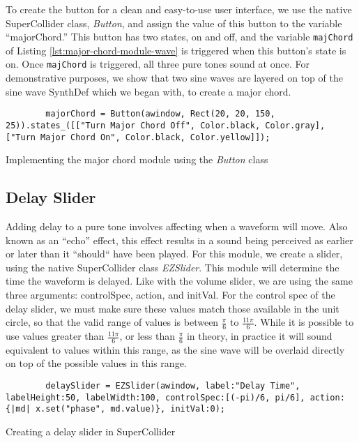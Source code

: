 To create the button for a clean and easy-to-use user interface, we use the native SuperCollider class, \textit{Button}, and assign the value of this button to the variable ``majorChord.'' This button has two states, on and off, and the variable \texttt{majChord} of Listing \ref{lst:major-chord-module-wave} is triggered when this button's state is on. Once \texttt{majChord} is triggered, all three pure tones sound at once. For demonstrative purposes, we show that two sine waves are layered on top of the sine wave SynthDef which we began with, to create a major chord.

\begin{listing}
	\begin{lstlisting}
		majorChord = Button(awindow, Rect(20, 20, 150, 25)).states_([["Turn Major Chord Off", Color.black, Color.gray], ["Turn Major Chord On", Color.black, Color.yellow]]);	
	\end{lstlisting}
	\label{lst:major-chord-button-wave}
	\caption{Implementing the major chord module using the \textit{Button} class}
\end{listing}

\subsection{Delay Slider}

Adding delay to a pure tone involves affecting when a waveform will move. Also known as an ``echo'' effect, this effect results in a sound being perceived as earlier or later than it ``should`` have been played. For this module, we create a slider, using the native SuperCollider class \textit{EZSlider}. This module will determine the time the waveform is delayed. Like with the volume slider, we are using the same three arguments: controlSpec, action, and initVal. For the control spec of the delay slider, we must make sure these values match those available in the unit circle, so that the valid range of values is between $\frac{\pi}{6}$ to $\frac{11\pi}{6}$. While it is possible to use values greater than $\frac{11\pi}{6}$, or less than $\frac{\pi}{6}$ in theory, in practice it will sound equivalent to values within this range, as the sine wave will be overlaid directly on top of the possible values in this range. 

\begin{listing}
	\begin{lstlisting}
		delaySlider = EZSlider(awindow, label:"Delay Time", labelHeight:50, labelWidth:100, controlSpec:[(-pi)/6, pi/6], action: {|md| x.set("phase", md.value)}, initVal:0);	
	\end{lstlisting}
	\caption{Creating a delay slider in SuperCollider}
	\label{lst:delay-slider}
\end{listing}

